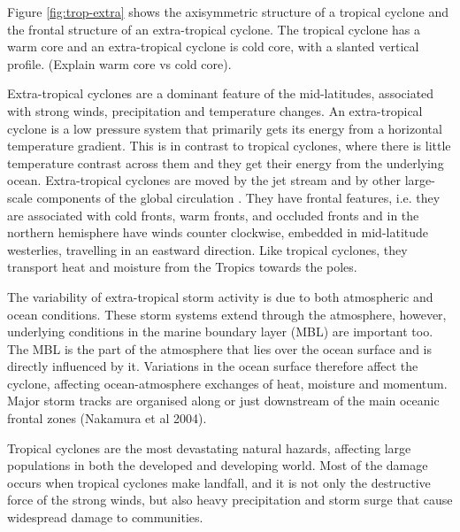 Figure \ref{fig:trop-extra} shows the axisymmetric structure of a tropical cyclone and the frontal structure of an extra-tropical cyclone. The tropical cyclone has a warm core and an extra-tropical cyclone is cold core, with a slanted vertical profile. (Explain warm core vs cold core).

Extra-tropical cyclones are a dominant feature of the mid-latitudes, associated with strong winds, precipitation and temperature changes. An extra-tropical cyclone is a low pressure system that primarily gets its energy from a horizontal temperature gradient. This is in contrast to tropical cyclones, where there is little temperature contrast across them and they get their energy from the underlying ocean. Extra-tropical cyclones are moved by the jet stream and by other large-scale components of the global circulation \citep{stull}. They have frontal features, i.e. they are associated with cold fronts, warm fronts, and occluded fronts and in the northern hemisphere have winds counter clockwise, embedded in mid-latitude westerlies, travelling in an eastward direction. Like tropical cyclones, they transport heat and moisture from the Tropics towards the poles.

The variability of extra-tropical storm activity is due to both atmospheric and ocean conditions. These storm systems extend through the atmosphere, however, underlying conditions in the marine boundary layer (MBL) are important too. The MBL is the part of the atmosphere that lies over the ocean surface and is directly influenced by it.  Variations in the ocean surface therefore affect the cyclone, affecting ocean-atmosphere exchanges of heat, moisture and momentum. Major storm tracks are organised along or just downstream of the main oceanic frontal zones (Nakamura et al 2004).


Tropical cyclones are the most devastating natural hazards, affecting large populations in both the developed and developing world. Most of the damage occurs when tropical cyclones make landfall, and it is not only the destructive force of the strong winds, but also heavy precipitation and storm surge that cause widespread damage to communities.

